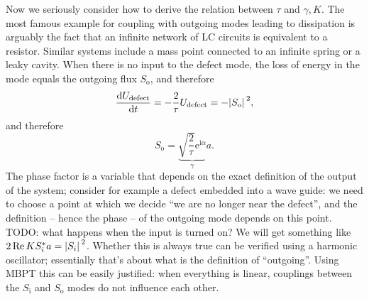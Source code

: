 \documentclass[hyperref, a4paper]{article}
\newcommand*{\ii}{\mathrm{i}}
\newcommand*{\ee}{\mathrm{e}}
\newcommand*{\Si}{S_{\text{i}}}
\newcommand*{\So}{S_{\text{o}}}
\begin{document}
Now we seriously consider how to derive the relation between $\tau$ and $\gamma, K$.
The most famous example for coupling with outgoing modes leading to dissipation 
is arguably the fact that an infinite network of LC circuits is equivalent to a resistor.
Similar systems include a mass point connected to an infinite spring or a leaky cavity.
When there is no input to the defect mode, 
the loss of energy in the mode equals the outgoing flux $\So$, and therefore 
\begin{equation}
    \dv{U_{\text{defect}}}{t} = - \frac{2}{\tau} U_{\text{defect}}
    = - \abs*{\So}^2,
\end{equation}
and therefore 
\begin{equation}
    \So = \underbrace{\sqrt{\frac{2}{\tau}} \ee^{\ii \alpha}}_\gamma a.
\end{equation}
The phase factor is a variable that depends on the exact definition of the output of the system;
consider for example a defect embedded into a wave guide: 
we need to choose a point at which we decide ``we are no longer near the defect'', 
and the definition -- hence the phase -- of the outgoing mode depends on this point.
TODO: what happens when the input is turned on? 
We will get something like $2\Re K S_i^* a = \abs*{S_i}^2$.
Whether this is always true can be verified using a harmonic oscillator; 
essentially that's about what is the definition of ``outgoing''. 
Using MBPT this can be easily justified:
when everything is linear, couplings between the $\Si$ and $\So$ modes do not influence each other.
\end{document}
